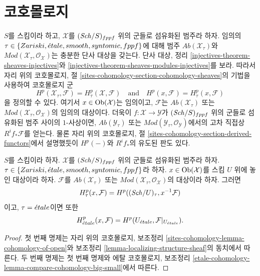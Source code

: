 \section{코호몰로지}
\label{section-cohomology-general}

\noindent
$S$를 스킴이라 하고, $\mathcal{X}$를 $(\mathit{Sch}/S)_{fppf}$ 위의
군들로 섬유화된 범주라 하자.
임의의 $\tau \in \{Zariski, {\acute{e}tale}, smooth, syntomic, fppf\}$에 대해
범주 $\textit{Ab}(\mathcal{X}_\tau)$와
$\textit{Mod}(\mathcal{X}_\tau, \mathcal{O}_\mathcal{X})$는
충분한 단사 대상을 갖는다. 단사 대상, 정리
\ref{injectives-theorem-sheaves-injectives}와
\ref{injectives-theorem-sheaves-modules-injectives}를 보라.
따라서 자리 위의 코호몰로지, 절
\ref{sites-cohomology-section-cohomology-sheaves}의 기법을 사용하여
코호몰로지 군
$$
H^p(\mathcal{X}_\tau, \mathcal{F}) = H^p_\tau(\mathcal{X}, \mathcal{F})
\quad\text{and}\quad
H^p(x, \mathcal{F}) = H^p_\tau(x, \mathcal{F})
$$
을 정의할 수 있다. 여기서 $x \in \mathop{\mathrm{Ob}}\nolimits(\mathcal{X})$는 임의이고,
$\mathcal{F}$는 $\textit{Ab}(\mathcal{X}_\tau)$ 또는
$\textit{Mod}(\mathcal{X}_\tau, \mathcal{O}_\mathcal{X})$의
임의의 대상이다. 더욱이 $f : \mathcal{X} \to \mathcal{Y}$가
$(\mathit{Sch}/S)_{fppf}$ 위의 군들로 섬유화된 범주 사이의 $1$-사상이면,
$\textit{Ab}(\mathcal{Y}_\tau)$ 또는
$\textit{Mod}(\mathcal{Y}_\tau, \mathcal{O}_\mathcal{Y})$에서의
고차 직접상 $R^if_*\mathcal{F}$를 얻는다.
물론 자리 위의 코호몰로지, 절
\ref{sites-cohomology-section-derived-functors}에서 설명했듯이
$H^p(-)$와 $R^if_*$의 유도된 판도 있다.

\begin{lemma}
\label{lemma-cohomology-restriction}
$S$를 스킴이라 하자. $\mathcal{X}$를 $(\mathit{Sch}/S)_{fppf}$ 위의
군들로 섬유화된 범주라 하자.
$\tau \in \{Zariski, {\acute{e}tale}, smooth, syntomic, fppf\}$라 하자.
$x \in \mathop{\mathrm{Ob}}\nolimits(\mathcal{X})$를 스킴 $U$ 위에 놓인 대상이라 하자.
$\mathcal{F}$를 $\textit{Ab}(\mathcal{X}_\tau)$ 또는
$\textit{Mod}(\mathcal{X}_\tau, \mathcal{O}_\mathcal{X})$의
대상이라 하자. 그러면
$$
H^p_\tau(x, \mathcal{F}) = H^p((\mathit{Sch}/U)_\tau, x^{-1}\mathcal{F})
$$
이고, $\tau = {\acute{e}tale}$이면 또한
$$
H^p_{\acute{e}tale}(x, \mathcal{F}) =
H^p(U_{\acute{e}tale}, \mathcal{F}|_{U_{\acute{e}tale}}).
$$
\end{lemma}

\begin{proof}
첫 번째 명제는 자리 위의 코호몰로지, 보조정리
\ref{sites-cohomology-lemma-cohomology-of-open}와 보조정리
\ref{lemma-localizing-structure-sheaf}의 동치에서 따른다.
두 번째 명제는 첫 번째 명제와 에탈 코호몰로지, 보조정리
\ref{etale-cohomology-lemma-compare-cohomology-big-small}에서 따른다.
\end{proof}














